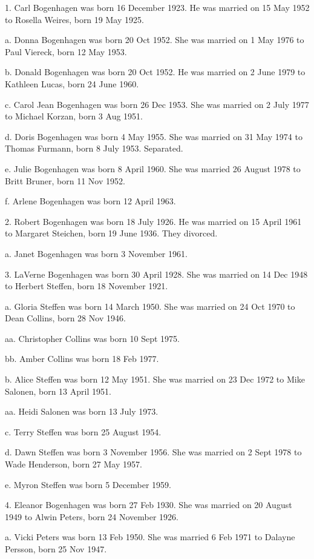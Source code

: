 \documentclass[a4paper]{article}
\begin{document}
1. Carl Bogenhagen was born 16 December 1923.  He was married on 15 May 1952 to Rosella Weires, born 19 May 1925.

a. Donna Bogenhagen was born 20 Oct 1952.  She was married on 1 May 1976 to Paul Viereck, born 12 May 1953.
 
b. Donald Bogenhagen was born 20 Oct 1952.  He was married on 2 June 1979 to Kathleen Lucas, born 24 June 1960.
 
c. Carol Jean Bogenhagen was born 26 Dec 1953.  She was married on 2 July 1977 to Michael Korzan, born 3 Aug 1951.
 
d. Doris Bogenhagen was born 4 May 1955.  She was married on 31 May 1974 to Thomas Furmann, born 8 July 1953.  Separated.
 
e. Julie Bogenhagen was born 8 April 1960.  She was married 26 August 1978 to Britt Bruner, born 11 Nov 1952.
 
f. Arlene Bogenhagen was born 12 April 1963.

2. Robert Bogenhagen was born 18 July 1926.  He was married on 15 April 1961 to Margaret Steichen, born 19 June 1936.  They divorced.		
 
a. Janet Bogenhagen was born 3 November 1961.

3. LaVerne Bogenhagen was born 30 April 1928.  She was married on 14 Dec 1948 to Herbert Steffen, born 18 November 1921.
 
a. Gloria Steffen was born 14 March 1950.  She was married on 24 Oct 1970 to Dean Collins, born 28 Nov 1946.
 
aa. Christopher Collins was born 10 Sept 1975.

bb. Amber Collins was born 18 Feb 1977.

b. Alice Steffen was born 12 May 1951.  She was married on 23 Dec 1972 to Mike Salonen, born 13 April 1951.
 
aa. Heidi Salonen was born 13 July 1973.

c. Terry Steffen was born 25 August 1954.

d. Dawn Steffen was born 3 November 1956.  She was married on 2 Sept 1978 to Wade Henderson, born 27 May 1957.
 
e. Myron Steffen was born 5 December 1959.
 
4. Eleanor Bogenhagen was born 27 Feb 1930.  She was married on 20 August 1949 to Alwin Peters, born 24 November 1926.  
 
a. Vicki Peters was born 13 Feb 1950.  She was married 6 Feb 1971 to Dalayne Persson, born 25 Nov 1947.
 
\end{document}
